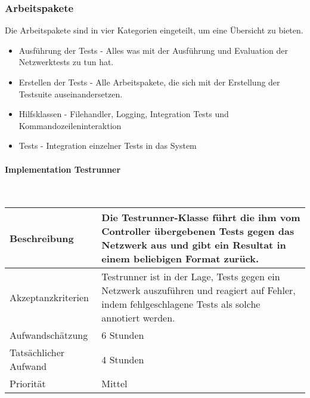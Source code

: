 \documentclass[]{subfiles}
\begin{document}
    \subsubsection{Arbeitspakete}
    Die Arbeitspakete sind in vier Kategorien eingeteilt, um eine Übersicht zu bieten. 
    \begin{itemize}
        \item Ausführung der Tests - Alles was mit der Ausführung und Evaluation der Netzwerktests zu tun hat.
        \item Erstellen der Tests - Alle Arbeitspakete, die sich mit der Erstellung der Testsuite auseinandersetzen.
        \item Hilfsklassen - Filehandler, Logging, Integration Tests und Kommandozeileninteraktion
        \item Tests - Integration einzelner Tests in das System
    \end{itemize}
    
        \paragraph*{Implementation Testrunner}\mbox{} \\
        \begin{tabularx}{\textwidth}{lX}
            \toprule
            Beschreibung & Die Testrunner-Klasse führt die ihm vom Controller übergebenen Tests gegen das Netzwerk aus und gibt ein Resultat in einem beliebigen Format zurück.\\
            \midrule
            Akzeptanzkriterien & Testrunner ist in der Lage, Tests gegen ein Netzwerk auszuführen und reagiert auf Fehler, indem fehlgeschlagene Tests als solche annotiert werden.\\
            \midrule
            Aufwandschätzung & 6 Stunden\\
            Tatsächlicher Aufwand & 4 Stunden \\
            \midrule
            Priorität & Mittel \\
            \bottomrule
        \end{tabularx}
    
\end{document}

